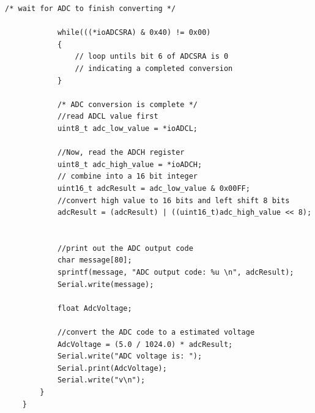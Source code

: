 \documentclass[11pt,pdftex,portrait,letterpaper]{article}
\begin{document}
\begin{lstlisting}[caption={Program 1}, label=l:programx]
			/* wait for ADC to finish converting */
			
			while(((*ioADCSRA) & 0x40) != 0x00)
			{
				// loop untils bit 6 of ADCSRA is 0 
				// indicating a completed conversion
			}
			
			/* ADC conversion is complete */
			//read ADCL value first
			uint8_t adc_low_value = *ioADCL;
			
			//Now, read the ADCH register
			uint8_t adc_high_value = *ioADCH;
			// combine into a 16 bit integer
			uint16_t adcResult = adc_low_value & 0x00FF;
			//convert high value to 16 bits and left shift 8 bits
			adcResult = (adcResult) | ((uint16_t)adc_high_value << 8);
			
			
			//print out the ADC output code
			char message[80];
			sprintf(message, "ADC output code: %u \n", adcResult);
			Serial.write(message);
			
			float AdcVoltage;
			
			//convert the ADC code to a estimated voltage
			AdcVoltage = (5.0 / 1024.0) * adcResult;
			Serial.write("ADC voltage is: ");
			Serial.print(AdcVoltage);
			Serial.write("v\n");
		}
	}
	
	\end{lstlisting}
	
\end{document}
